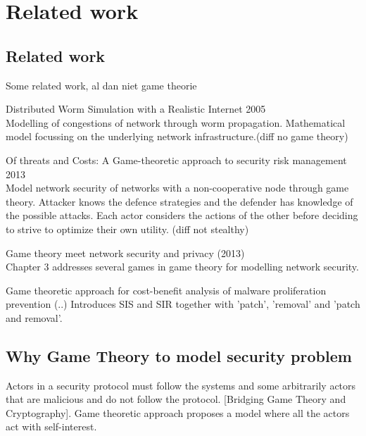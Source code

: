 \chapter{Related work}
\label{cha:1}



\section{Related work}

Some related work, al dan niet game theorie

\begin{description}
\item Distributed Worm Simulation with a Realistic Internet 2005  \\
Modelling of congestions of network through worm propagation. Mathematical model focussing on the underlying network infrastructure.(diff no game theory) 
\item Of threats and Costs: A Game-theoretic approach to security risk management 2013\\
Model network security of networks with a non-cooperative node through game theory. Attacker knows the defence strategies and the defender has knowledge of the possible attacks. Each actor considers the actions of the other before deciding to strive to optimize their own utility. (diff not stealthy)
\item Game theory meet network security and privacy (2013) \\
Chapter 3 addresses several games in game theory for modelling network security.
\item Game theoretic approach for cost-benefit analysis of malware proliferation prevention (..)
Introduces SIS and SIR together with 'patch', 'removal' and 'patch and removal'.
\end{description}

\section{Why Game Theory to model security problem}
Actors in a security protocol must follow the systems and some arbitrarily actors that are malicious and do not follow the protocol. [Bridging Game Theory and Cryptography]. Game theoretic approach proposes a model where all the actors act with self-interest. 




